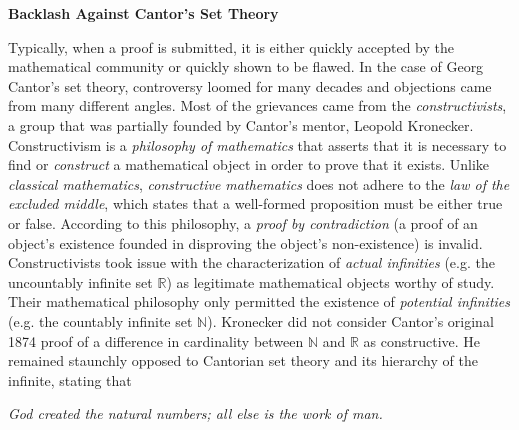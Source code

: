 \begin{tcolorbox}[breakable, enhanced, colback=textbook-blue, sharp corners]
	\vspace{2mm}
	\begin{center}
		\textbf{Backlash Against Cantor's Set Theory}
	\end{center}
	\vspace{1mm}
	Typically, when a proof is submitted, it is either quickly accepted by the mathematical community or quickly shown to be flawed. In the case of Georg Cantor's set theory, controversy loomed for many decades and objections came from many different angles. Most of the grievances came from the \textit{constructivists}, a group that was partially founded by Cantor's mentor, Leopold Kronecker. \\
	
	Constructivism is a \textit{philosophy of mathematics} that asserts that it is necessary to find or \textit{construct} a mathematical object in order to prove that it exists. Unlike \textit{classical mathematics}, \textit{constructive mathematics} does not adhere to the \textit{law of the excluded middle}, which states that a well-formed proposition must be either true or false. According to this philosophy, a \textit{proof by contradiction} (a proof of an object's existence founded in disproving the object's non-existence) is invalid. Constructivists took issue with the characterization of \textit{actual infinities} (e.g. the uncountably infinite set $\mathbb{R}$) as legitimate mathematical objects worthy of study. Their mathematical philosophy only permitted the existence of \textit{potential infinities} (e.g. the countably infinite set $\mathbb{N}$). Kronecker did not consider Cantor's original 1874 proof of a difference in cardinality between $\mathbb{N}$ and $\mathbb{R}$ as constructive. He remained staunchly opposed to Cantorian set theory and its hierarchy of the infinite, stating that \\
	
	\begin{center}
		\begin{displayquote}
			\centering
			\textit{God created the natural numbers; all else is the work of man.}
			\vspace{4mm}
		\end{displayquote}
	\end{center}


\end{tcolorbox}
